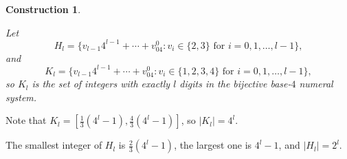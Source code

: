 \documentclass[11pt]{article}
\numberwithin{table}{section}
\newtheorem{constr}[theorem]{\bf Construction}
\theoremstyle{definition}
\begin{document}

	
	
	
	
	\begin{constr}\label{z_m}
		
		Let
		\[H_l=\{v_{l-1}4^{l-1}+\cdots +v_04^0 : 
		v_i\in \{2,3\}\text{ for }i=0,1,\ldots ,l-1\},\]
		and
		\[K_l=\{v_{l-1}4^{l-1}+\cdots +v_04^0 : 
		v_i\in \{1,2,3,4\}\text{ for }i=0,1,\ldots ,l-1\},\]
		so $K_l$ is the set of integers with exactly $l$ digits in the bijective base-$4$ numeral system. 
	\end{constr}
	
	Note that $K_l=[\frac13(4^l-1),\frac43(4^l-1)]$, so $|K_l|=4^l$.
	
	The smallest integer of $H_l$ is $\frac23(4^l-1)$, the largest one is $4^l-1$, and $|H_l|=2^l$.
	
\end{document}
